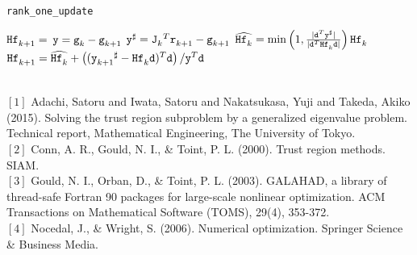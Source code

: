 \begin{algorithm}
\caption{{\tt rank\_one\_update}}
\label{alg:rank_one_update}
  \begin{algorithmic}
     $\iter[k+1]{\thess} = $ 
    \State $\ty = \iter[k]{\tg} - \iter[k+1]{\tg}$ \State
    $\ty^\sharp = {\iter[k]{\tJ}}^T \iter[k+1]{\tr} -
    \iter[k+1]{\tg}$ \State $\widehat{\iter[k]{\thess}} = \min\left(
      1, \frac{|\td^T\ty^\sharp|}{|\td^T\iter[k]{\thess}\td|}\right)
    \iter[k]{\thess}$ \State $\iter[k+1]{\thess} =
    \widehat{\iter[k]{\thess}} + \left(({\iter[k+1]{\ty}}^\sharp -
      \iter[k]{\thess}\td )^T\td\right)/\ty^T\td$

  \end{algorithmic}
\end{algorithm}

\hslreferences\\
$[1]$ Adachi, Satoru and Iwata, Satoru and Nakatsukasa, Yuji and Takeda, Akiko (2015).
Solving the trust region subproblem by a generalized eigenvalue problem.
Technical report, Mathematical Engineering, The University of Tokyo.\\
$[2]$ Conn, A. R., Gould, N. I., \& Toint, P. L. (2000). Trust region methods. SIAM.\\
$[3]$ Gould, N. I., Orban, D., \& Toint, P. L. (2003). GALAHAD, a library of thread-safe Fortran 90 packages for large-scale nonlinear optimization. ACM Transactions on Mathematical Software (TOMS), 29(4), 353-372.\\
$[4]$ Nocedal, J., \& Wright, S. (2006). Numerical optimization. Springer Science \& Business Media.

